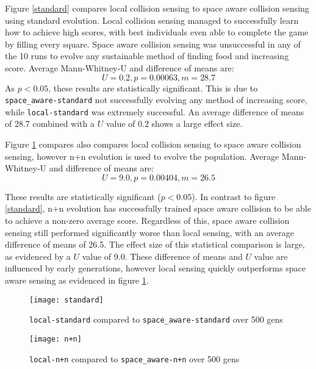 Figure \ref{standard} compares local collision sensing to space aware collision sensing using standard evolution. Local collision sensing managed to successfully learn how to achieve high scores, with best individuals even able to complete the game by filling every square. Space aware collision sensing was unsuccessful in any of the 10 runs to evolve any sustainable method of finding food and increasing score. Average Mann-Whitney-U and difference of means are:
$$
U = 0.2, p = 0.00063, m = 28.7
$$
As $p < 0.05$, these results are statistically significant. This is due to \verb|space_aware-standard| not successfully evolving any method of increasing score, while \verb|local-standard| was extremely successful. An average difference of means of 28.7 combined with a $U$ value of 0.2 shows a large effect size.
\bigskip

Figure \ref{n+n} compares also compares local collision sensing to space aware collision sensing, however n+n evolution is used to evolve the population.  Average Mann-Whitney-U and difference of means are:
$$
U = 9.0, p = 0.00404, m = 26.5
$$

These results are statistically significant ($p < 0.05$). In contrast to figure \ref{standard}, n+n evolution has successfully trained space aware collision to be able to achieve a non-zero average score. Regardless of this, space aware collision sensing still performed significantly worse than local sensing, with an average difference of means of 26.5. The effect size of this statistical comparison is large, as evidenced by a $U$ value of 9.0. These difference of means and $U$ value are influenced by early generations, however local sensing quickly outperforms space aware sensing as evidenced in figure \ref{n+n}.

\begin{figure}[h]
  \centering
  \begin{minipage}{.5\textwidth}
    \centering
    \captionsetup{width=.8\linewidth}
    \texttt{[image: standard]}
    \caption{\texttt{local-standard} compared to \texttt{space\_aware-standard} over 500 gens}
    \label{standard}
  \end{minipage}%
  \begin{minipage}{.5\textwidth}
    \centering
    \captionsetup{width=.8\linewidth}
    \texttt{[image: n+n]}
    \caption{\texttt{local-n+n} compared to \texttt{space\_aware-n+n} over 500 gens}
    \label{n+n}
  \end{minipage}
\end{figure}






